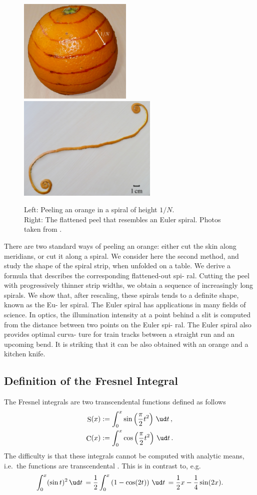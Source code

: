 \documentclass[12pt]{article}
\DeclareMathOperator\Cee{C} %
\def\d#1{{\,\ud#1\,}}
\DeclareMathOperator\eS{S} %
\begin{document}
\begin{figure}[h!]
    \centering
	\includegraphics[height=5cm]{orange.jpg} \hfill
	\includegraphics[height=5cm]{orangePeel.jpg}
	\label{f:orangePeel}
	\caption{Left: Peeling an orange in a spiral of height $1/N$.\\
		Right: The flattened peel that resembles an Euler spiral.  Photos taken from \cite{BH12}.
	}
\end{figure}
There are two standard ways of peeling an orange: either cut the skin along meridians, or cut it along a spiral. We consider here the second method, and study the shape of the spiral strip, when unfolded on a table. We derive a formula that describes the corresponding flattened-out spi- ral. Cutting the peel with progressively thinner strip widths, we obtain a sequence of increasingly long spirals. We show that, after rescaling, these spirals tends to a definite shape, known as the Eu- ler spiral. The Euler spiral has applications in many fields of science. In optics, the illumination intensity at a point behind a slit is computed from the distance between two points on the Euler spi- ral. The Euler spiral also provides optimal curva- ture for train tracks between a straight run and an upcoming bend. It is striking that it can be also obtained with an orange and a kitchen knife.


\subsection{Definition of the Fresnel Integral}
The Fresnel integrals are two transcendental functions defined as follows
\begin{align}
  \eS(x) &:= \int_0^x  \sin\left(\frac\pi2 t^2\right) \d{t}, \\
  \Cee(x) &:= \int_0^x \cos\left(\frac\pi2 t^2\right) \d{t}.
\end{align}
The difficulty is that these integrals cannot be computed with analytic means, i.e.~the functions are transcendental \cite[p.195ff]{AS}.  This is in contrast to, e.g.
$$ \int_0^x (\sin t)^2 \d{t} = \frac12\int_0^x \left(1-\cos(2t)\right)\d{t} = \frac12x -\frac14\sin(2x).
$$
\end{document}
